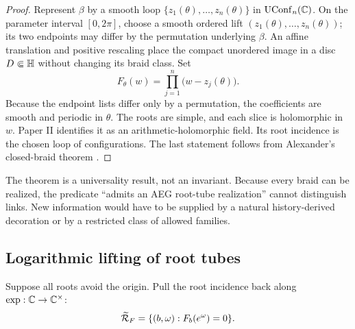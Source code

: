 \begin{proof}
Represent $\beta$ by a smooth loop
$\{z_1(\theta),\ldots,z_n(\theta)\}$ in
$\operatorname{UConf}_n(\mathbb{C})$.  On the parameter interval $[0,2\pi]$, choose a smooth ordered
lift $(z_1(\theta),\ldots,z_n(\theta))$; its two endpoints may differ by the
permutation underlying $\beta$.  An affine translation and positive rescaling
place the compact unordered image in a disc $D\Subset\mathbb{H}$ without changing its
braid class.  Set
\begin{equation}
 F_\theta(w)=\prod_{j=1}^n\bigl(w-z_j(\theta)\bigr).
 \label{eq:aeg-braid-polynomial}
\end{equation}
Because the endpoint lists differ only by a permutation, the coefficients are
smooth and periodic in $\theta$.  The roots are simple, and
each slice is holomorphic in $w$.  Paper II identifies it as an
arithmetic-holomorphic field.  Its root incidence is the chosen loop of
configurations.  The last statement follows from Alexander's closed-braid theorem
\cite{Alexander1923KnottedCurves}.
\end{proof}

The theorem is a universality result, not an invariant.  Because every braid can
be realized, the predicate ``admits an AEG root-tube realization'' cannot
distinguish links.  New information would have to be supplied by a natural
history-derived decoration or by a restricted class of allowed families.

\subsection{Logarithmic lifting of root tubes}

Suppose all roots avoid the origin.  Pull the root incidence back along
$\exp:\mathbb{C}\to\mathbb{C}^\times$:
\begin{equation}
 \widetilde{\mathcal R}_F
 =\{(b,\omega):F_b(e^\omega)=0\}.
 \label{eq:log-root-incidence}
\end{equation}

